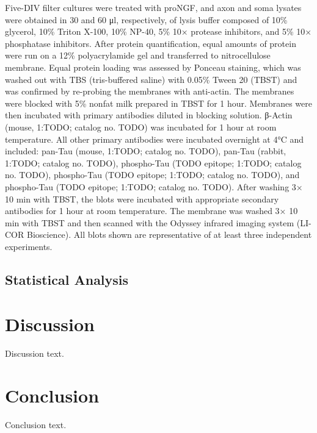 \documentclass[
  letterpaper,
  DIV=11,
  numbers=noendperiod]{scrreprt}
\begin{document}
Five-DIV filter cultures were treated with proNGF, and axon and soma
lysates were obtained in 30 and 60 μl, respectively, of lysis buffer
composed of 10\% glycerol, 10\% Triton X-100, 10\% NP-40, 5\% 10×
protease inhibitors, and 5\% 10× phosphatase inhibitors. After protein
quantification, equal amounts of protein were run on a 12\%
polyacrylamide gel and transferred to nitrocellulose membrane. Equal
protein loading was assessed by Ponceau staining, which was washed out
with TBS (tris-buffered saline) with 0.05\% Tween 20 (TBST) and was
confirmed by re-probing the membranes with anti-actin. The membranes
were blocked with 5\% nonfat milk prepared in TBST for 1 hour. Membranes
were then incubated with primary antibodies diluted in blocking
solution. β-Actin (mouse, 1:TODO; catalog no. TODO) was incubated for 1
hour at room temperature. All other primary antibodies were incubated
overnight at 4°C and included: pan-Tau (mouse, 1:TODO; catalog no.
TODO), pan-Tau (rabbit, 1:TODO; catalog no. TODO), phospho-Tau (TODO
epitope; 1:TODO; catalog no. TODO), phospho-Tau (TODO epitope; 1:TODO;
catalog no. TODO), and phospho-Tau (TODO epitope; 1:TODO; catalog no.
TODO). After washing 3× 10 min with TBST, the blots were incubated with
appropriate secondary antibodies for 1 hour at room temperature. The
membrane was washed 3× 10 min with TBST and then scanned with the
Odyssey infrared imaging system (LI-COR Bioscience). All blots shown are
representative of at least three independent experiments.

\section{Statistical Analysis}\label{statistical-analysis}


\chapter{Discussion}\label{discussion}

Discussion text.


\chapter{Conclusion}\label{conclusion}

Conclusion text.

\end{document}
